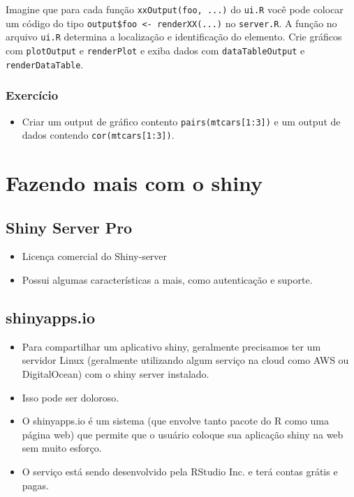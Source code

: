 \documentclass[]{book}
\providecommand{\tightlist}{%
  \setlength{\itemsep}{0pt}\setlength{\parskip}{0pt}}
\begin{document}
Imagine que para cada função
\texttt{xxOutput(\textquotesingle{}foo\textquotesingle{},\ ...)} do
\texttt{ui.R} você pode colocar um código do tipo
\texttt{output\$foo\ \textless{}-\ renderXX(...)} no \texttt{server.R}.
A função no arquivo \texttt{ui.R} determina a localização e
identificação do elemento. Crie gráficos com \texttt{plotOutput} e
\texttt{renderPlot} e exiba dados com \texttt{dataTableOutput} e
\texttt{renderDataTable}.

\subsubsection{Exercício}\label{exercicio-1}

\begin{itemize}
\tightlist
\item
  Criar um output de gráfico contento \texttt{pairs(mtcars{[}1:3{]})} e
  um output de dados contendo \texttt{cor(mtcars{[}1:3{]})}.
\end{itemize}

\section{Fazendo mais com o shiny}\label{fazendo-mais-com-o-shiny}

\subsection{Shiny Server Pro}\label{shiny-server-pro}

\begin{itemize}
\tightlist
\item
  Licença comercial do Shiny-server
\item
  Possui algumas características a mais, como autenticação e suporte.
\end{itemize}

\subsection{shinyapps.io}\label{shinyapps.io}

\begin{itemize}
\tightlist
\item
  Para compartilhar um aplicativo shiny, geralmente precisamos ter um
  servidor Linux (geralmente utilizando algum serviço na cloud como AWS
  ou DigitalOcean) com o shiny server instalado.
\item
  Isso pode ser doloroso.
\item
  O shinyapps.io é um sistema (que envolve tanto pacote do R como uma
  página web) que permite que o usuário coloque sua aplicação shiny na
  web sem muito esforço.
\item
  O serviço está sendo desenvolvido pela RStudio Inc. e terá contas
  grátis e pagas.
\end{itemize}
\end{document}
